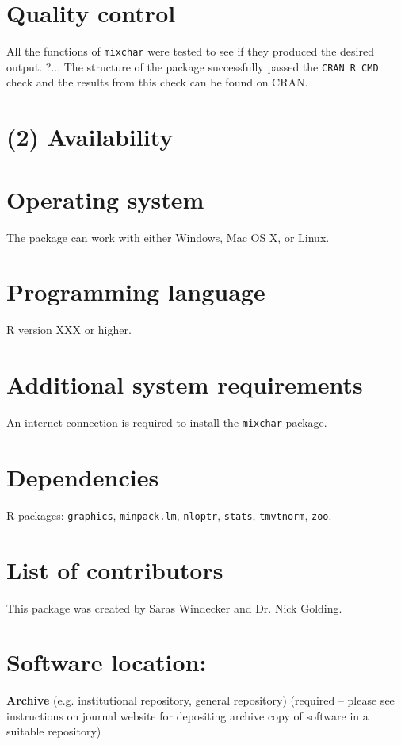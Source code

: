 \documentclass{jors}\usepackage[]{graphicx}\usepackage[]{color}
\begin{document}
\section*{Quality control}
All the functions of \verb|mixchar| were tested to see if they produced the desired output. ?... The structure of the package successfully passed the \verb|CRAN R CMD| check and the results from this check can be found on CRAN.

\section*{(2) Availability}
\vspace{0.5cm}
\section*{Operating system}
The package can work with either Windows, Mac OS X, or Linux.

\section*{Programming language}
R version XXX or higher.

\section*{Additional system requirements}
An internet connection is required to install the \verb|mixchar| package.

\section*{Dependencies}
R packages: \verb|graphics|, \verb|minpack.lm|, \verb|nloptr|, \verb|stats|, \verb|tmvtnorm|, \verb|zoo|.

\section*{List of contributors}
This package was created by Saras Windecker and Dr. Nick Golding.

\section*{Software location:}

{\bf Archive} (e.g. institutional repository, general repository) (required – please see instructions on journal website for depositing archive copy of software in a suitable repository)
\end{document}

